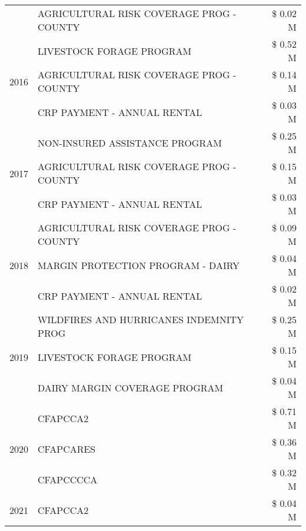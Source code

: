 \begin{tabular}{llr}
 & AGRICULTURAL RISK COVERAGE PROG - COUNTY & \$ 0.02 M \\
\cline{1-3}
\multirow[t]{3}{*}{2016} & LIVESTOCK FORAGE PROGRAM                      & \$ 0.52 M \\
 & AGRICULTURAL RISK COVERAGE PROG - COUNTY      & \$ 0.14 M \\
 & CRP PAYMENT - ANNUAL RENTAL                   & \$ 0.03 M \\
\cline{1-3}
\multirow[t]{3}{*}{2017} & NON-INSURED ASSISTANCE PROGRAM & \$ 0.25 M \\
 & AGRICULTURAL RISK COVERAGE PROG - COUNTY & \$ 0.15 M \\
 & CRP PAYMENT - ANNUAL RENTAL & \$ 0.03 M \\
\cline{1-3}
\multirow[t]{3}{*}{2018} & AGRICULTURAL RISK COVERAGE PROG - COUNTY & \$ 0.09 M \\
 & MARGIN PROTECTION PROGRAM - DAIRY & \$ 0.04 M \\
 & CRP PAYMENT - ANNUAL RENTAL & \$ 0.02 M \\
\cline{1-3}
\multirow[t]{3}{*}{2019} & WILDFIRES AND HURRICANES INDEMNITY PROG & \$ 0.25 M \\
 & LIVESTOCK FORAGE PROGRAM & \$ 0.15 M \\
 & DAIRY MARGIN COVERAGE PROGRAM & \$ 0.04 M \\
\cline{1-3}
\multirow[t]{3}{*}{2020} & CFAPCCA2 & \$ 0.71 M \\
 & CFAPCARES & \$ 0.36 M \\
 & CFAPCCCCA & \$ 0.32 M \\
\cline{1-3}
2021 & CFAPCCA2 & \$ 0.04 M \\
\cline{1-3}
\bottomrule
\end{tabular}
